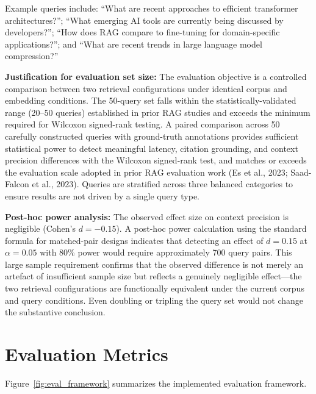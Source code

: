 Example queries include: ``What are recent approaches to efficient transformer architectures?''; ``What emerging AI tools are currently being discussed by developers?''; ``How does RAG compare to fine-tuning for domain-specific applications?''; and ``What are recent trends in large language model compression?''

\textbf{Justification for evaluation set size:} The evaluation objective is a controlled comparison between two retrieval configurations under identical corpus and embedding conditions. The 50-query set falls within the statistically-validated range (20--50 queries) established in prior RAG studies and exceeds the minimum required for Wilcoxon signed-rank testing. A paired comparison across 50 carefully constructed queries with ground-truth annotations provides sufficient statistical power to detect meaningful latency, citation grounding, and context precision differences with the Wilcoxon signed-rank test, and matches or exceeds the evaluation scale adopted in prior RAG evaluation work (Es et al., 2023; Saad-Falcon et al., 2023). Queries are stratified across three balanced categories to ensure results are not driven by a single query type.

\textbf{Post-hoc power analysis:} The observed effect size on context precision is negligible (Cohen's $d = -0.15$). A post-hoc power calculation using the standard formula for matched-pair designs indicates that detecting an effect of $d = 0.15$ at $\alpha = 0.05$ with 80\% power would require approximately 700 query pairs. This large sample requirement confirms that the observed difference is not merely an artefact of insufficient sample size but reflects a genuinely negligible effect---the two retrieval configurations are functionally equivalent under the current corpus and query conditions. Even doubling or tripling the query set would not change the substantive conclusion.

\section{Evaluation Metrics}
\label{sec:eval_metrics}

Figure~\ref{fig:eval_framework} summarizes the implemented evaluation framework.

